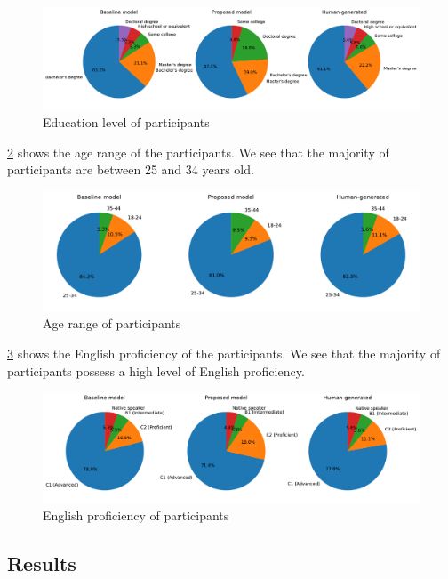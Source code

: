 \begin{figure}[h]
    \centering
    \includegraphics[width=\textwidth]{figures/education_pie.pdf}
    \caption{Education level of participants}
    \label{fig:education_pie}
\end{figure}

\cref{fig:age_range_pie} shows the age range of the participants. We see that the majority of participants are between 25 and 34 years old.

\begin{figure}[h]
    \centering
    \includegraphics[width=\textwidth]{figures/age_range_pie.pdf}
    \caption{Age range of participants}
    \label{fig:age_range_pie}
\end{figure}

\cref{fig:english_prof_pie} shows the English proficiency of the participants. We see that the majority of participants possess a high level of English proficiency.

\begin{figure}[h]
    \centering
    \includegraphics[width=\textwidth]{figures/english_prof_pie.pdf}
    \caption{English proficiency of participants}
    \label{fig:english_prof_pie}
\end{figure}

\subsection{Results}
